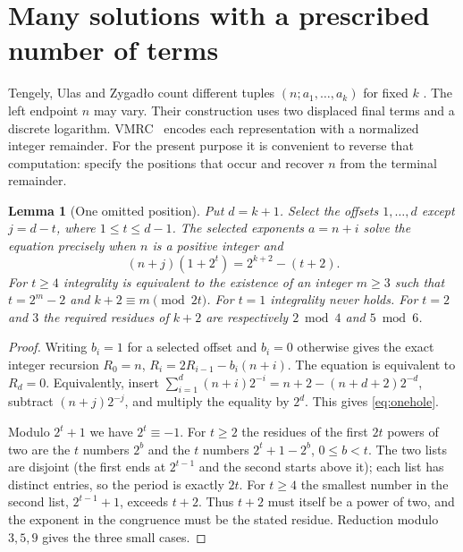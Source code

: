 \documentclass[11pt]{article}
\newtheorem{lemma}[theorem]{Lemma}
\begin{document}
\section{Many solutions with a prescribed number of terms}
\label{sec:tuz}
Tengely, Ulas and Zygad\l o count different tuples
$(n;a_1,\ldots,a_k)$ for fixed $k$ \cite[Conjecture 3.3]{tuz}.
The left endpoint $n$ may vary. Their construction uses two displaced
final terms and a discrete logarithm. VMRC~\cite{vm090} encodes each
representation with a normalized integer remainder. For the present
purpose it is convenient to reverse that computation: specify the
positions that occur and recover $n$ from the terminal remainder.

\begin{lemma}[One omitted position]\label{lem:hole}
Put $d=k+1$. Select the offsets $1,\ldots,d$ except $j=d-t$,
where $1\le t\le d-1$. The selected exponents $a=n+i$ solve the
equation precisely when $n$ is a positive integer and
\begin{equation}
 (n+j)(1+2^t)=2^{k+2}-(t+2).\label{eq:onehole}
\end{equation}
For $t\ge4$ integrality is equivalent to the existence of an integer
$m\ge3$ such that $t=2^m-2$ and $k+2\equiv m\pmod{2t}$.
For $t=1$ integrality never holds. For $t=2$ and $3$ the required
residues of $k+2$ are respectively $2\bmod4$ and $5\bmod6$.
\end{lemma}
\begin{proof}
Writing $b_i=1$ for a selected offset and $b_i=0$ otherwise gives
the exact integer recursion
$R_0=n$, $R_i=2R_{i-1}-b_i(n+i)$.
The equation is equivalent to $R_d=0$. Equivalently, insert
$\sum_{i=1}^d(n+i)2^{-i}=n+2-(n+d+2)2^{-d}$,
subtract $(n+j)2^{-j}$, and multiply the equality by $2^d$.
This gives \eqref{eq:onehole}.

Modulo $2^t+1$ we have $2^t\equiv-1$. For $t\ge2$ the residues of the
first $2t$ powers of two are the $t$ numbers $2^b$ and the $t$
numbers $2^t+1-2^b$, $0\le b<t$. The two lists are disjoint
(the first ends at $2^{t-1}$ and the second starts above it);
each list has distinct entries, so the period is exactly $2t$.
For $t\ge4$ the smallest number in the second list, $2^{t-1}+1$,
exceeds $t+2$. Thus $t+2$ must itself be a power of two,
and the exponent in the congruence must be the stated residue.
Reduction modulo $3,5,9$ gives the three small cases.
\end{proof}
\end{document}
